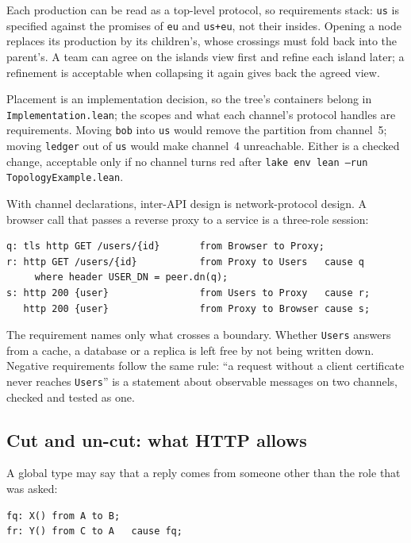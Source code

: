 

Each production can be read as a top-level protocol, so requirements stack:
\texttt{us} is specified against the promises of \texttt{eu} and
\texttt{us+eu}, not their insides. Opening a node replaces its production by its
children's, whose crossings must fold back into the parent's. A team can agree
on the islands view first and refine each island later; a refinement is
acceptable when collapsing it again gives back the agreed view.

Placement is an implementation decision, so the tree's containers belong in
\texttt{Implementation.lean}; the scopes and what each channel's protocol handles
are requirements. Moving \texttt{bob} into \texttt{us} would remove the partition
from channel~5; moving \texttt{ledger} out of \texttt{us} would make channel~4
unreachable. Either is a checked change, acceptable only if no channel turns red
after \texttt{lake env lean --run TopologyExample.lean}.

With channel declarations, inter-API design is network-protocol design. A browser
call that passes a reverse proxy to a service is a three-role session:

\begin{lstlisting}[language={}]
q: tls http GET /users/{id}       from Browser to Proxy;
r: http GET /users/{id}           from Proxy to Users   cause q
     where header USER_DN = peer.dn(q);
s: http 200 {user}                from Users to Proxy   cause r;
   http 200 {user}                from Proxy to Browser cause s;
\end{lstlisting}

The requirement names only what crosses a boundary. Whether \texttt{Users}
answers from a cache, a database or a replica is left free by not being written
down. Negative requirements follow the same rule: ``a request without a client
certificate never reaches \texttt{Users}'' is a statement about observable
messages on two channels, checked and tested as one.

\subsection{Cut and un-cut: what HTTP allows}

A global type may say that a reply comes from someone other than the role that
was asked:

\begin{lstlisting}[language={}]
fq: X() from A to B;
fr: Y() from C to A   cause fq;
\end{lstlisting}

